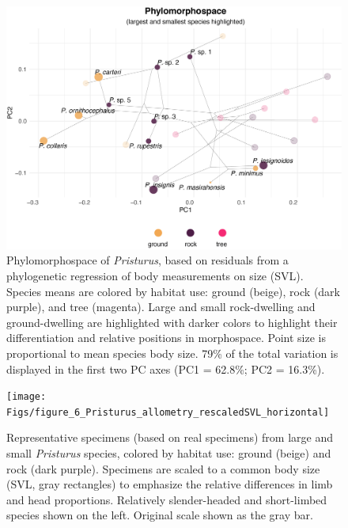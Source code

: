 \documentclass[
  11pt,
]{article}
\begin{document}
\newpage

\begin{figure}

{\centering \includegraphics[width=1\linewidth]{Figs/figure_5_phylomorphospace_large_small} 

}

\caption{Phylomorphospace of \textit{Pristurus}, based on residuals from a phylogenetic regression of body measurements on size (SVL). Species means are colored by habitat use: ground (beige), rock (dark purple), and tree (magenta). Large and small rock-dwelling and ground-dwelling are highlighted with darker colors to highlight their differentiation and relative positions in morphospace. Point size is proportional to mean species body size. 79\% of the total variation is displayed in the first two PC axes (PC1 = 62.8\%; PC2 = 16.3\%).}\label{fig:unnamed-chunk-9}
\end{figure}

\newpage

\begin{figure}

{\centering \texttt{[image: Figs/figure\_6\_Pristurus\_allometry\_rescaledSVL\_horizontal]} 

}

\caption{Representative specimens (based on real specimens) from large and small \textit{Pristurus} species, colored by habitat use: ground (beige) and rock (dark purple). Specimens are scaled to a common body size (SVL, gray rectangles) to emphasize the relative differences in limb and head proportions. Relatively slender-headed and short-limbed species shown on the left. Original scale shown as the gray bar.}\label{fig:unnamed-chunk-10}
\end{figure}
\end{document}
